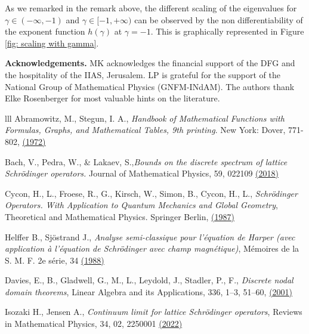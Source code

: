 \documentclass[12pt, reqno]{amsart}
\theoremstyle{definition}
\numberwithin{equation}{section}
\begin{document}
As we remarked in the remark above, the different scaling of the eigenvalues for $\gamma\in (-\infty,-1)$ and $\gamma \in [-1,+\infty)$ can be observed by the non differentiability of the exponent function $h(\gamma)$ at $\gamma = -1$. This is graphically represented in Figure \ref{fig: scaling with gamma}.
 

 \vspace{5mm}
\textbf{Acknowledgements.} MK acknowledges the financial support of the DFG and the hospitality of the IIAS, Jerusalem.  LP is grateful for the support of the National Group of Mathematical Physics (GNFM-INdAM). The authors thank Elke Rosenberger for most valuable hints on the literature.


\begin{thebibliography}{lll}
Abramowitz, M., Stegun, I. A.,  \textit{Handbook of Mathematical Functions with Formulas, Graphs, and Mathematical Tables, 9th printing}. New York: Dover, 771-802, \href{https://personal.math.ubc.ca/~cbm/aands/frameindex.htm}{(1972)}

 Bach, V., Pedra, W., \& Lakaev, S.,\textit{Bounds on the discrete spectrum of lattice Schr\"{o}dinger operators.} Journal of Mathematical Physics, 59, 022109 \href{https://doi.org/10.1063/1.5006641}{(2018)}

 Cycon, H., L., Froese, R., G., Kirsch, W., Simon, B., Cycon, H., L., \textit{Schr\"{o}dinger Operators. With Application to Quantum Mechanics and Global Geometry}, Theoretical and Mathematical Physics. Springer Berlin, \href{https://doi.org/10.1007/978-3-540-77522-5}{(1987)}


 Helffer B., Sj\"{o}strand J., \textit{Analyse semi-classique pour l’\'{e}quation de
Harper (avec application \`{a} l’\'{e}quation de Schr\"{o}dinger avec champ
magn\'{e}tique)}, M\'{e}moires de la S. M. F. 2e
s\'{e}rie, 34 \href{https://www.numdam.org/item/SEDP_1986-1987____A16_0/}{(1988)}

 Davies, E., B., Gladwell, G., M., L., Leydold, J., Stadler, P., F., \textit{Discrete nodal domain theorems}, Linear Algebra and its Applications, 336, 1--3, 51--60, \href{https://doi.org/10.1016/S0024-3795(01)00313-5}{(2001)}

 Isozaki H., Jensen A.,
\textit{Continuum limit for lattice Schrödinger operators}, Reviews in Mathematical Physics, 34,  02, 2250001 \href{https://doi.org/10.1142/S0129055X22500015}{(2022)}


\end{thebibliography}
\end{document}
